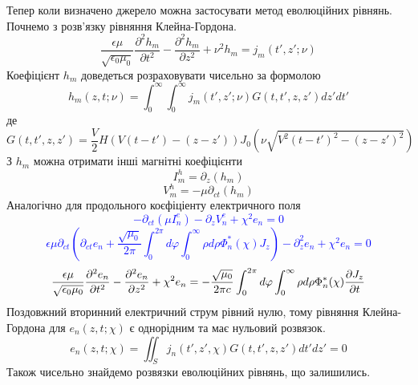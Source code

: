 Тепер коли визначено джерело можна застосувати метод еволюційних рівнянь.
Почнемо з розв'язку рівняння Клейна-Гордона.
%
\begin{equation*}
\frac{\epsilon \mu}{ \sqrt{\epsilon_0 \mu_0}} 
\frac{\partial^2 h_m}{\partial t^2} - \frac{\partial^2 h_m}{\partial z^2} + 
\nu^2 h_m = j_m (t',z'; \nu)
\end{equation*}
%
Коефіцієнт $ h_m $ доведеться розраховувати чисельно за формолою
%
\begin{equation*}
h_m (z, t; \nu) = \int_{0}^{\infty} \int_{0}^{\infty}
j_m (t',z'; \nu) G(t,t',z,z') dz' dt'
\end{equation*}
%
де 
%
\begin{equation*}
G(t,t',z,z') = \frac{\mathit{V}}{2} H \left( \mathit{V} (t-t') - (z-z') \right)
J_0 \left( \nu \sqrt{\mathit{V}^2 (t-t')^2 - (z-z')^2} \right)
\end{equation*}
%
З $ h_m $ можна отримати інші магнітні коефіцієнти
%
\begin{equation*}
I_m^h = \partial_z (h_m)
\end{equation*}
%
\begin{equation*}
V_m^h = - \mu \partial_{ct} (h_m)
\end{equation*}
%
Аналогічно для продольного коєфіціенту електричного поля
%
\textcolor{blue}{ \begin{equation*}
- \partial_{ct}(\mu I_n^e) - \partial_z V_n^e + \chi^2 e_n = 0
\end{equation*} }
%
\textcolor{blue}{ \begin{equation*}
\epsilon \mu \partial_{ct} \left( \partial_{ct} e_n + 
\frac{\sqrt{\mu_0}}{2 \pi} \int_0^{2\pi} d \varphi 
\int_0^{\infty} \rho d \rho \Phi_n^* (\chi) J_z \right) - 
\partial^2_z e_n + \chi^2 e_n = 0
\end{equation*} }
%
\begin{equation*}
\frac{\epsilon \mu}{ \sqrt{\epsilon_0 \mu_0}} 
\frac{\partial^2 e_n}{\partial t^2} - 
\frac{\partial^2 e_n}{\partial z^2} + \chi^2 e_n = 
- \frac{\sqrt{\mu_0}}{2 \pi c} 
\int_0^{2\pi} d \varphi 
\int_0^{\infty} \rho d \rho \Phi_n^* (\chi) \frac{\partial J_z}{\partial t}
\end{equation*}
%
Поздовжний вторинний електричний струм рівний нулю, тому рівняння 
Клейна-Гордона для $ e_n (z, t; \chi) $ є однорідним та має нульовий розвязок.
%
\begin{equation*}
e_n (z, t; \chi) = \iint_S j_n (t',z', \chi) G(t,t',z,z') dt' dz' = 0
\end{equation*}
%
Також чисельно знайдемо розвязки еволюційних рівнянь, що залишились.
